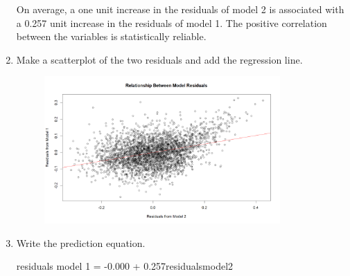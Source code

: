 \documentclass[12pt,letterpaper]{article}
\begin{document}
\begin{enumerate}
\begin{table}[!htbp]
			\vspace{1.5cm}
			
			\noindent
			On average, a one unit increase in the residuals of model 2 is associated with a 0.257 unit increase in the residuals of model 1. The positive correlation between the variables is statistically reliable.
	
		\end{table} \vspace{6cm}
		\newpage
		\item Make a scatterplot of the two residuals and add the regression line.
 	
		\begin{figure}[h!]
			\centering
			\caption{\footnotesize}
			\label{fig:plot_4}
			\includegraphics[width=0.85\textwidth]{Plot4}  
		\end{figure} 	\vspace{2cm}
		\item Write the prediction equation.
		\noindent
		
		residuals model 1 = -0.000 + 0.257residualsmodel2
	\end{enumerate}
	
	\newpage	
\end{document}
